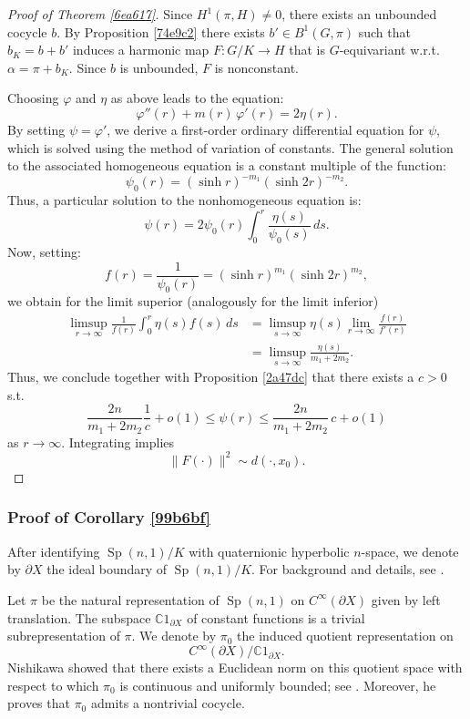\documentclass[12pt]{amsart}
\theoremstyle{definition}
\begin{document}
\begin{proof}[Proof of Theorem \ref{6ea617}]
Since \(H^1(\pi,H)\neq0\), there exists an unbounded cocycle \(b\). By
Proposition \ref{74e9c2} there exists \(b' \in B^{1}(G,\pi)\) such that
\(b_{K} = b + b'\) induces a harmonic map \(F: G/K \to H\) that is
\(G\)-equivariant w.r.t. \(\alpha = \pi + b_{K}\). Since \(b\) is
unbounded, \(F\) is nonconstant.

Choosing \(\varphi\) and \(\eta\) as above leads to the equation:
\[ \varphi''(r) + m(r) \, \varphi'(r) = 2 \eta(r). \] By setting
\(\psi = \varphi'\), we derive a first-order ordinary differential
equation for \(\psi\), which is solved using the method of variation of
constants. The general solution to the associated homogeneous equation
is a constant multiple of the function:
\[ \psi_0(r) = (\sinh r)^{-m_1} (\sinh 2r)^{-m_2}. \] Thus, a particular
solution to the nonhomogeneous equation is:
\[ \psi(r) = 2\psi_0(r) \int_0^r \frac{\eta(s)}{\psi_0(s)} \, ds. \]
Now, setting:
\[ f(r) = \frac{1}{\psi_0(r)} = (\sinh r)^{m_1} (\sinh 2r)^{m_2}, \] we
obtain for the limit superior (analogously for the limit inferior)
\[ \begin{split} \limsup_{r \to \infty} \frac{1}{f(r)} \int_0^r \eta(s) f(s) \, ds &= \limsup_{s \to \infty} \eta(s) \lim_{ r \to \infty } \frac{f(r)}{f'(r)} \\& = \limsup_{s \to \infty} \frac{\eta(s)}{m_1 + 2 m_2}. \end{split} \]
Thus, we conclude together with Proposition \ref{2a47dc} that there
exists a \(c > 0\) s.t.
\[ \frac{2n }{m_1 + 2 m_2} \frac{1}{c}  + o(1) \leq \psi(r) \leq \frac{2n }{m_1 + 2 m_2} \, c + o(1) \]
as \(r \to \infty\). Integrating implies \[
\|F(\cdot)\|^{2} \sim d(\cdot,x_{0}).
\]

\end{proof}


\subsubsection{Proof of Corollary \ref{99b6bf} }
\label{sec:proof_of_corollary_ref99b6bf}

After identifying \(\operatorname{Sp}(n,1)/K\) with quaternionic
hyperbolic \(n\)-space, we denote by \(\partial X\) the ideal boundary
of \(\operatorname{Sp}(n,1)/K\). For background and details, see
\cite[Chapter~3]{Cherix2001}.

Let \(\pi\) be the natural representation of \(\operatorname{Sp}(n,1)\)
on \(C^{\infty}(\partial X)\) given by left translation. The subspace
\(\mathbb{C}1_{\partial X}\) of constant functions is a trivial
subrepresentation of \(\pi\). We denote by \(\pi_0\) the induced
quotient representation on
\[C^{\infty}(\partial X) \big/ \mathbb{C}1_{\partial X}.\] Nishikawa
showed that there exists a Euclidean norm on this quotient space with
respect to which \(\pi_0\) is continuous and uniformly bounded; see
\cite[Proposition~2.13]{Nishikawa2020_preprint}. Moreover, he proves
that \(\pi_0\) admits a nontrivial cocycle.
\end{document}
